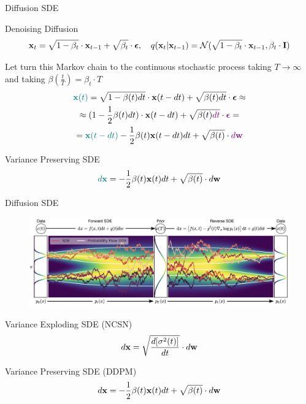 \begin{frame}{Diffusion SDE}
	\begin{block}{Denoising Diffusion}
		\vspace{-0.5cm}
		\[
			\mathbf{x}_t = \sqrt{1 - \beta_t} \cdot \mathbf{x}_{t - 1} + \sqrt{\beta_t} \cdot \boldsymbol{\epsilon}, \quad q(\mathbf{x}_t | \mathbf{x}_{t-1}) = \mathcal{N}(\sqrt{1 - \beta_t} \cdot \mathbf{x}_{t-1}, \beta_t \cdot \mathbf{I})
		\]
		\vspace{-0.5cm}
	\end{block}
	Let turn this Markov chain to the continuous stochastic process taking $T \rightarrow \infty$ and taking $\beta(\frac{t}{T}) = \beta_t \cdot T$
	\begin{multline*}
		{\color{teal}\mathbf{x}(t)} = \sqrt{1 - \beta(t) dt} \cdot \mathbf{x}(t - dt) + \sqrt{\beta(t)dt} \cdot \boldsymbol{\epsilon} \approx \\
		\approx (1 - \frac{1}{2} \beta(t) dt) \cdot \mathbf{x}(t - dt) + \sqrt{\beta(t){\color{violet}dt}} \cdot {\color{violet}\boldsymbol{\epsilon}} = \\
		= {\color{teal}\mathbf{x}(t - dt)} - \frac{1}{2} \beta(t) \mathbf{x}(t - dt) dt  + \sqrt{\beta(t)} \cdot {\color{violet}d \mathbf{w}}
	\end{multline*}
	\vspace{-0.5cm}
	\begin{block}{Variance Preserving SDE}
		\vspace{-0.3cm}
		\[
			{\color{teal}d \mathbf{x}} = - \frac{1}{2} \beta(t) \mathbf{x}(t) dt + \sqrt{\beta(t)} \cdot d \mathbf{w}
		\]
	\end{block}
\end{frame}
\begin{frame}{Diffusion SDE}
	\begin{figure}
		\includegraphics[width=\linewidth]{figs/sde}
	\end{figure}
	\vspace{-0.3cm}
	\begin{block}{Variance Exploding SDE (NCSN)}
		\vspace{-0.3cm}
		\[
			d \mathbf{x} = \sqrt{\frac{ d [\sigma^2(t)]}{dt}} \cdot d \mathbf{w}
		\]
		\vspace{-0.3cm}
	\end{block}
	\begin{block}{Variance Preserving SDE (DDPM)}
		\vspace{-0.3cm}
		\[
			d \mathbf{x} = - \frac{1}{2} \beta(t) \mathbf{x}(t) dt + \sqrt{\beta(t)} \cdot d \mathbf{w}
		\]
	\end{block}
\end{frame}
